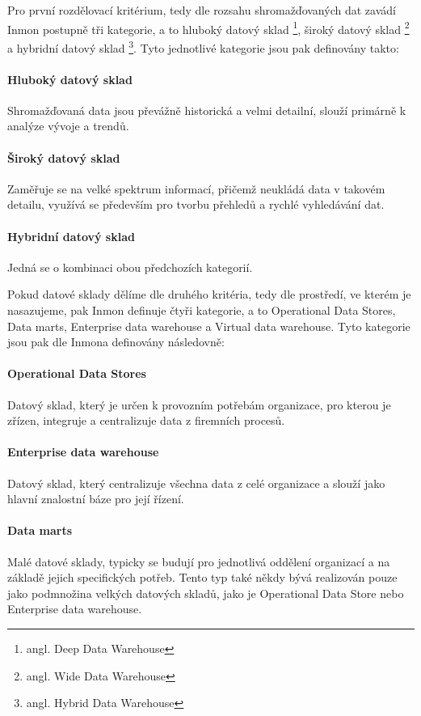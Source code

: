 \documentclass[
  digital,     %
  twoside,     %
  lof,         %
  lot,         %
]{fithesis4}
\begin{document}
Pro první rozdělovací kritérium, tedy dle rozsahu shromažďovaných dat zavádí Inmon
postupně tři kategorie, a to hluboký datový sklad \footnote{angl. Deep Data Warehouse}, široký
datový sklad \footnote{angl. Wide Data Warehouse} a hybridní datový sklad \footnote{angl. Hybrid Data
Warehouse}. Tyto jednotlivé kategorie jsou pak definovány takto:
\paragraph{Hluboký datový sklad}
Shromažďovaná data jsou převážně historická a velmi detailní, slouží primárně k analýze vývoje a trendů.
\paragraph{Široký datový sklad}
Zaměřuje se na velké spektrum informací, přičemž neukládá data v takovém detailu, využívá se především pro tvorbu přehledů a rychlé vyhledávání dat.
\paragraph{Hybridní datový sklad}
Jedná se o kombinaci obou předchozích kategorií.

 \vspace{5mm}
Pokud datové sklady dělíme dle druhého kritéria, tedy dle prostředí, ve kterém je
nasazujeme, pak Inmon definuje čtyři kategorie, a to Operational Data Stores, Data marts,
Enterprise data warehouse a Virtual data warehouse. Tyto kategorie jsou pak dle Inmona definovány následovně:

\paragraph{Operational Data Stores}
Datový sklad, který je určen k provozním potřebám organizace, pro kterou je zřízen, integruje a centralizuje data z firemních procesů.
\paragraph{Enterprise data warehouse}
Datový sklad, který centralizuje všechna data z celé organizace a slouží jako hlavní znalostní báze pro její řízení.
\paragraph{Data marts}
Malé datové sklady, typicky se budují pro jednotlivá oddělení organizací a na základě jejich specifických potřeb. Tento typ také někdy bývá realizován pouze jako podmnožina velkých datových skladů, jako je Operational Data Store nebo Enterprise data warehouse.
\end{document}

